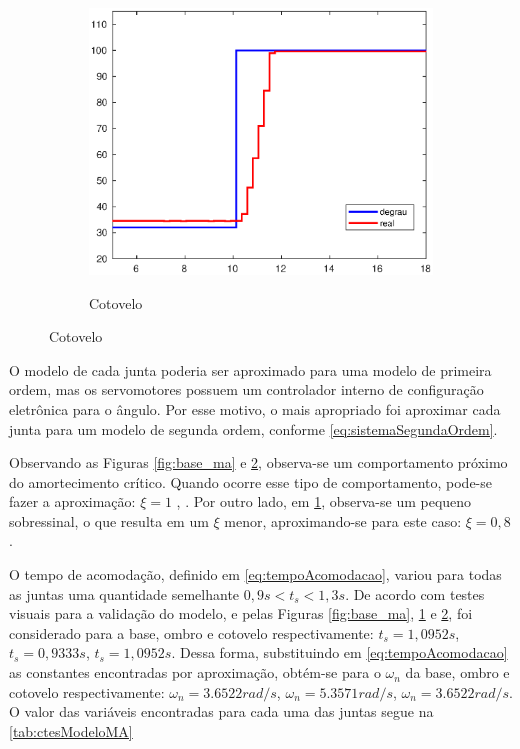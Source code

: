 \begin{figure}[h!]
\begin{subfigure}{.5\textwidth}
    \label{fig:shoulder_ma}
  \end{subfigure}%
  \\[5ex]
  \begin{subfigure}{\textwidth}
    \centering
    \caption{Cotovelo}
    \includegraphics[width = 0.55\columnwidth]{Imagens/forearm_ma}
    \label{fig:forearm_ma}
  \end{subfigure}%
  
  \label{fig:ensaioMalhaAberta} 

\end{figure}

O modelo de cada junta poderia ser aproximado para uma modelo de primeira ordem, mas os servomotores possuem
um controlador interno de configuração eletrônica para o ângulo. Por esse motivo, o mais apropriado foi 
aproximar cada junta para um modelo de segunda ordem, conforme \eqref{eq:sistemaSegundaOrdem}.

Observando as Figuras \ref{fig:base_ma} e \ref{fig:forearm_ma}, observa-se um comportamento próximo do 
amortecimento crítico. Quando ocorre esse tipo de comportamento, pode-se fazer a 
aproximação: $\xi = 1$ \cite{Ogata}, \cite{Castrucci}. Por outro lado, em \ref{fig:shoulder_ma}, observa-se
um pequeno sobressinal, o que resulta em um $\xi$ menor, aproximando-se para este caso: $\xi = 0,8$.

O tempo de acomodação, definido em \eqref{eq:tempoAcomodacao}, variou para todas as juntas uma quantidade
semelhante $0,9s < t_s < 1,3s$. De acordo com testes visuais para a validação do modelo, e pelas Figuras 
\ref{fig:base_ma}, \ref{fig:shoulder_ma} e \ref{fig:forearm_ma}, foi considerado para a base, ombro e
cotovelo respectivamente: $t_s = 1,0952s$, $t_s = 0,9333s$, $t_s = 1,0952s$. Dessa forma, substituindo em 
\eqref{eq:tempoAcomodacao} as constantes encontradas por aproximação, obtém-se para o $\omega_n$ da base, ombro e
cotovelo respectivamente: $\omega_n = 3.6522 rad/s$, $\omega_n = 5.3571 rad/s$, $\omega_n = 3.6522 rad/s$.
O valor das variáveis encontradas para cada uma das juntas segue na \autoref{tab:ctesModeloMA}

